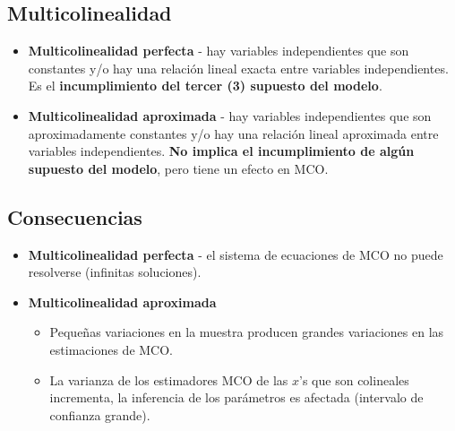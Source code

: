 \documentclass[10pt, a4paper, landscape]{extarticle}
\begin{document}
\begin{multicols}{3}
\columnbreak

\section*{Multicolinealidad}
	\begin{itemize}[leftmargin=*]
		\item \textbf{Multicolinealidad perfecta} - hay variables independientes que son constantes y/o hay una relación lineal exacta entre variables independientes. Es el \textbf{incumplimiento del tercer (3) supuesto del modelo}.
		\item \textbf{Multicolinealidad aproximada} - hay variables independientes que son aproximadamente constantes y/o hay una relación lineal aproximada entre variables independientes. \textbf{No implica el incumplimiento de algún supuesto del modelo}, pero tiene un efecto en MCO.
	\end{itemize}
	\subsection*{Consecuencias}
		\begin{itemize}[leftmargin=*]
			\item \textbf{Multicolinealidad perfecta} - el sistema de ecuaciones de MCO no puede resolverse (infinitas soluciones).
			\item \textbf{Multicolinealidad aproximada}
			\begin{itemize}[leftmargin=*]
				\item Pequeñas variaciones en la muestra producen grandes variaciones en las estimaciones de MCO.
				\item La varianza de los estimadores MCO de las $x$'s que son colineales incrementa, la inferencia de los parámetros es afectada (intervalo de confianza grande).
			\end{itemize}
		\end{itemize}

\end{multicols}
\end{document}
